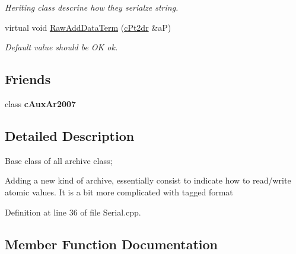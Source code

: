 \begin{DoxyCompactItemize}
\begin{DoxyCompactList}\small\item\em Heriting class descrine how they serialze string. \end{DoxyCompactList}\item 
virtual void \hyperlink{classMMVII_1_1cAr2007_a89f0adb6629f3aa25a895a71cf2c19e2}{Raw\+Add\+Data\+Term} (\hyperlink{classMMVII_1_1cPt2d}{c\+Pt2dr} \&aP)\hypertarget{classMMVII_1_1cAr2007_a89f0adb6629f3aa25a895a71cf2c19e2}{}\label{classMMVII_1_1cAr2007_a89f0adb6629f3aa25a895a71cf2c19e2}

\begin{DoxyCompactList}\small\item\em Default value should be OK ok. \end{DoxyCompactList}\end{DoxyCompactItemize}
\subsection*{Friends}
\begin{DoxyCompactItemize}
\item 
class {\bfseries c\+Aux\+Ar2007}\hypertarget{classMMVII_1_1cAr2007_a8a45e8d67462a363d51e6cccd0eb4381}{}\label{classMMVII_1_1cAr2007_a8a45e8d67462a363d51e6cccd0eb4381}

\end{DoxyCompactItemize}


\subsection{Detailed Description}
Base class of all archive class;

Adding a new kind of archive, essentially consist to indicate how to read/write atomic values. It is a bit more complicated with tagged format 

Definition at line 36 of file Serial.\+cpp.



\subsection{Member Function Documentation}
